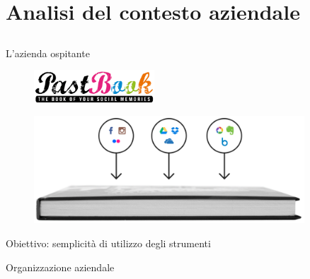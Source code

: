 \section{Analisi del contesto aziendale}
	\subsection{}
		\begin{frame}{L'azienda ospitante}
			\begin{figure}[H]
				\centering
				\includegraphics[width=0.4\textwidth]{capitolo_1/immagini/logo_pastbook.png}
			\end{figure}
			\begin{figure}[H]
				\centering
				\includegraphics[width=0.9\textwidth]{capitolo_1/immagini/photo_book_one_click.png}
			\end{figure}
		\end{frame}
		\begin{frame}{Obiettivo: semplicità di utilizzo degli strumenti}
			
		\end{frame}
		\begin{frame}{Organizzazione aziendale}
		\end{frame}
